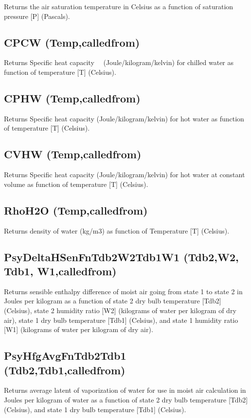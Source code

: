 Returns the air saturation temperature in Celsius as a function of saturation pressure {[}P{]} (Pascals).

\subsection{CPCW (Temp,calledfrom)}\label{cpcw-tempcalledfrom}

Returns Specific heat capacity~~ (Joule/kilogram/kelvin) for chilled water as function of temperature {[}T{]} (Celsius).

\subsection{CPHW (Temp,calledfrom)}\label{cphw-tempcalledfrom}

Returns Specific heat capacity (Joule/kilogram/kelvin) for hot water as function of temperature {[}T{]} (Celsius).

\subsection{CVHW (Temp,calledfrom)}\label{cvhw-tempcalledfrom}

Returns Specific heat capacity (Joule/kilogram/kelvin) for hot water at constant volume as function of temperature {[}T{]} (Celsius).

\subsection{RhoH2O (Temp,calledfrom)}\label{rhoh2o-tempcalledfrom}

Returns density of water (kg/m3) as function of Temperature {[}T{]} (Celsius).

\subsection{PsyDeltaHSenFnTdb2W2Tdb1W1 (Tdb2,W2, Tdb1, W1,calledfrom)}\label{psydeltahsenfntdb2w2tdb1w1-tdb2w2tdb1w1calledfrom}

Returns sensible enthalpy difference of moist air going from state 1 to state 2 in Joules per kilogram as a function of 
state 2 dry bulb temperature {[}Tdb2{]} (Celsius), state 2 humidity ratio {[}W2{]} (kilograms of water per kilogram of dry air),
state 1 dry bulb temperature {[}Tdb1{]} (Celsius), and state 1 humidity ratio {[}W1{]} (kilograms of water per kilogram of dry air).

\subsection{PsyHfgAvgFnTdb2Tdb1 (Tdb2,Tdb1,calledfrom)}\label{psyhfgavgfntdb2tdb1-tdb2w2tdb1calledfrom}

Returns average latent of vaporization of water for use in moist air calculation in Joules per kilogram of water as a function of 
state 2 dry bulb temperature {[}Tdb2{]} (Celsius), and state 1 dry bulb temperature {[}Tdb1{]} (Celsius).